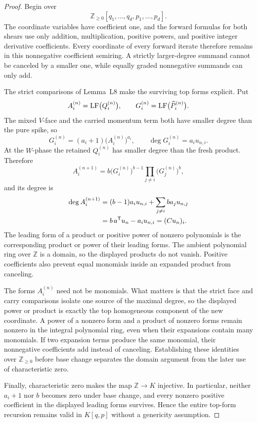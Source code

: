 \documentclass[11pt,letterpaper]{article}
\theoremstyle{plain}
\begin{document}
\begin{proof}
Begin over
\[
\mathbb Z_{\geq0}[q_1,\ldots,q_d,p_1,\ldots,p_d].
\]
The coordinate variables have coefficient one, and the forward formulas for both shears use only addition, multiplication, positive powers, and positive integer derivative coefficients.  Every coordinate of every forward iterate therefore remains in this nonnegative coefficient semiring.  A strictly larger-degree summand cannot be canceled by a smaller one, while equally graded nonnegative summands can only add.

The strict comparisons of Lemma~L8 make the surviving top forms explicit.  Put
\[
A_i^{(n)}=\operatorname{LF}\bigl(Q_i^{(n)}\bigr),
\qquad
G_i^{(n)}=\operatorname{LF}\bigl(\widehat P_i^{(n)}\bigr).
\]
The mixed $V$-face and the carried momentum term both have smaller degree than the pure spike, so
\[
G_i^{(n)}
=(a_i+1)\bigl(A_i^{(n)}\bigr)^{a_i},
\qquad
\deg G_i^{(n)}=a_i u_{n,i}.
\]
At the $W$-phase the retained $Q_i^{(n)}$ has smaller degree than the fresh product.  Therefore
\[
A_i^{(n+1)}
=b\bigl(G_i^{(n)}\bigr)^{b-1}
  \prod_{j\ne i}\bigl(G_j^{(n)}\bigr)^b,
\]
and its degree is
\begin{align*}
\deg A_i^{(n+1)}
&=(b-1)a_i u_{n,i}
  +\sum_{j\ne i}ba_j u_{n,j}\\
&=b\,a^{\mathsf{T}}u_n-a_i u_{n,i}
=(Cu_n)_i.
\end{align*}
The leading form of a product or positive power of nonzero polynomials is the corresponding product or power of their leading forms.  The ambient polynomial ring over $\mathbb Z$ is a domain, so the displayed products do not vanish.  Positive coefficients also prevent equal monomials inside an expanded product from canceling.

The forms \(A_i^{(n)}\) need not be monomials.  What matters is that the strict face and carry comparisons isolate one source of the maximal degree, so the displayed power or product is exactly the top homogeneous component of the new coordinate.  A power of a nonzero form and a product of nonzero forms remain nonzero in the integral polynomial ring, even when their expansions contain many monomials.  If two expansion terms produce the same monomial, their nonnegative coefficients add instead of canceling.  Establishing these identities over \(\mathbb Z_{\geq0}\) before base change separates the domain argument from the later use of characteristic zero.

Finally, characteristic zero makes the map $\mathbb Z\to K$ injective.  In particular, neither $a_i+1$ nor $b$ becomes zero under base change, and every nonzero positive coefficient in the displayed leading forms survives.  Hence the entire top-form recursion remains valid in $K[q,p]$ without a genericity assumption.
\end{proof}
\end{document}
